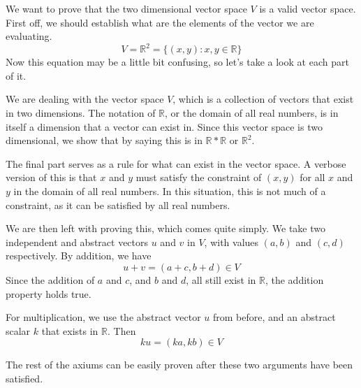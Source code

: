 \begin{exmp}
    We want to prove that the two dimensional vector space $V$ is a valid vector
    space.  First off, we should establish what are the elements of the vector
    we are evaluating.
    \begin{equation*}
        V = \mathbb{R}^2 = \{(x,y):x,y \in \mathbb{R} \}
    \end{equation*}
    Now this equation may be a little bit confusing, so let's take a look at
    each part of it.

    We are dealing with the vector space $V$, which is a collection of vectors
    that exist in two dimensions. The notation of $\mathbb{R}$, or the domain of
    all real numbers, is in itself a dimension that a vector can exist in. Since
    this vector space is two dimensional, we show that by saying this is in
    $\mathbb{R}*\mathbb{R}$ or $\mathbb{R}^2$. 

    The final part serves as a rule for what can exist in the
    vector space. A verbose version of this is that $x$ and $y$ must satisfy the
    constraint of $(x,y)$ for all $x$ and $y$ in the domain of all real numbers.
    In this situation, this is not much of a constraint, as it can be satisfied
    by all real numbers.

    We are then left with proving this, which comes quite simply. We take two
    independent and abstract vectors $u$ and $v$ in $V$, with values $(a,b)$ and
    $(c,d)$ respectively. By addition, we have
    \begin{equation*}
        u + v = (a + c, b + d) \in V
    \end{equation*}
    Since the addition of $a$ and $c$, and $b$ and $d$, all still exist in
    $\mathbb{R}$, the addition property holds true.

    For multiplication, we use the abstract vector $u$ from before, and an
    abstract scalar $k$ that exists in $\mathbb{R}$. Then
    \begin{equation*}
        ku = (ka, kb) \in V
    \end{equation*}

    The rest of the axiums can be easily proven after these two arguments have
    been satisfied.
\end{exmp}

